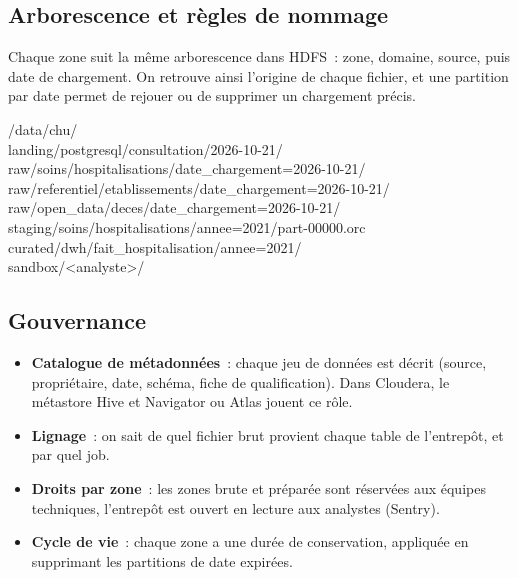\subsection{Arborescence et règles de nommage}

\noindent Chaque zone suit la même arborescence dans HDFS~: zone, domaine, source, puis date de chargement. On retrouve ainsi l'origine de chaque fichier, et une partition par date permet de rejouer ou de supprimer un chargement précis.

\begin{center}
\begin{minipage}{0.72\textwidth}
\begin{tcolorbox}[colback=title2!6,colframe=title1,title=\textbf{Arborescence HDFS du lac CHU},fonttitle=\small,boxsep=2pt]
\ttfamily\scriptsize
/data/chu/\\
\hspace*{1em}landing/postgresql/consultation/2026-10-21/\\
\hspace*{1em}raw/soins/hospitalisations/date\_chargement=2026-10-21/\\
\hspace*{1em}raw/referentiel/etablissements/date\_chargement=2026-10-21/\\
\hspace*{1em}raw/open\_data/deces/date\_chargement=2026-10-21/\\
\hspace*{1em}staging/soins/hospitalisations/annee=2021/part-00000.orc\\
\hspace*{1em}curated/dwh/fait\_hospitalisation/annee=2021/\\
\hspace*{1em}sandbox/<analyste>/
\end{tcolorbox}
\end{minipage}
\end{center}

\subsection{Gouvernance}

\begin{itemize}
	\item \textbf{Catalogue de métadonnées}~: chaque jeu de données est décrit (source, propriétaire, date, schéma, fiche de qualification). Dans Cloudera, le métastore Hive et Navigator ou Atlas jouent ce rôle.
	\item \textbf{Lignage}~: on sait de quel fichier brut provient chaque table de l'entrepôt, et par quel job.
	\item \textbf{Droits par zone}~: les zones brute et préparée sont réservées aux équipes techniques, l'entrepôt est ouvert en lecture aux analystes (Sentry).
	\item \textbf{Cycle de vie}~: chaque zone a une durée de conservation, appliquée en supprimant les partitions de date expirées.
\end{itemize}

